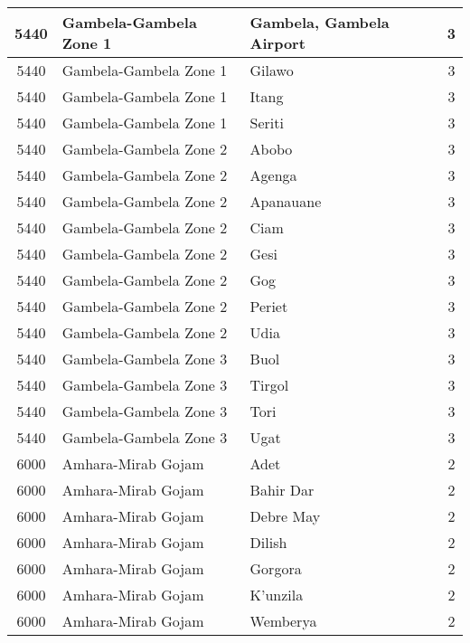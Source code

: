 \documentclass[12pt,a4paper]{report}
\begin{document}
\begin{tabular}{|c|l|l|c|}
\hline 
\rule[-1ex]{0pt}{2.5ex} 5440 & Gambela-Gambela Zone 1 & Gambela, Gambela Airport & 3 \\
\hline 
\rule[-1ex]{0pt}{2.5ex} 5440 & Gambela-Gambela Zone 1 & Gilawo & 3 \\
\hline 
\rule[-1ex]{0pt}{2.5ex} 5440 & Gambela-Gambela Zone 1 & Itang & 3 \\
\hline 
\rule[-1ex]{0pt}{2.5ex} 5440 & Gambela-Gambela Zone 1 & Seriti & 3 \\
\hline 
\rule[-1ex]{0pt}{2.5ex} 5440 & Gambela-Gambela Zone 2 & Abobo & 3 \\
\hline 
\rule[-1ex]{0pt}{2.5ex} 5440 & Gambela-Gambela Zone 2 & Agenga & 3 \\
\hline 
\rule[-1ex]{0pt}{2.5ex} 5440 & Gambela-Gambela Zone 2 & Apanauane & 3 \\
\hline 
\rule[-1ex]{0pt}{2.5ex} 5440 & Gambela-Gambela Zone 2 & Ciam & 3 \\
\hline 
\rule[-1ex]{0pt}{2.5ex} 5440 & Gambela-Gambela Zone 2 & Gesi & 3 \\
\hline 
\rule[-1ex]{0pt}{2.5ex} 5440 & Gambela-Gambela Zone 2 & Gog & 3 \\
\hline 
\rule[-1ex]{0pt}{2.5ex} 5440 & Gambela-Gambela Zone 2 & Periet & 3 \\
\hline 
\rule[-1ex]{0pt}{2.5ex} 5440 & Gambela-Gambela Zone 2 & Udia & 3 \\
\hline 
\rule[-1ex]{0pt}{2.5ex} 5440 & Gambela-Gambela Zone 3 & Buol & 3 \\
\hline 
\rule[-1ex]{0pt}{2.5ex} 5440 & Gambela-Gambela Zone 3 & Tirgol & 3 \\
\hline 
\rule[-1ex]{0pt}{2.5ex} 5440 & Gambela-Gambela Zone 3 & Tori & 3 \\
\hline 
\rule[-1ex]{0pt}{2.5ex} 5440 & Gambela-Gambela Zone 3 & Ugat & 3 \\
\hline 
\rule[-1ex]{0pt}{2.5ex} 6000 & Amhara-Mirab Gojam & Adet & 2 \\
\hline 
\rule[-1ex]{0pt}{2.5ex} 6000 & Amhara-Mirab Gojam & Bahir Dar & 2 \\
\hline 
\rule[-1ex]{0pt}{2.5ex} 6000 & Amhara-Mirab Gojam & Debre May & 2 \\
\hline 
\rule[-1ex]{0pt}{2.5ex} 6000 & Amhara-Mirab Gojam & Dilish & 2 \\
\hline 
\rule[-1ex]{0pt}{2.5ex} 6000 & Amhara-Mirab Gojam & Gorgora & 2 \\
\hline 
\rule[-1ex]{0pt}{2.5ex} 6000 & Amhara-Mirab Gojam & K'unzila & 2 \\
\hline 
\rule[-1ex]{0pt}{2.5ex} 6000 & Amhara-Mirab Gojam & Wemberya & 2 \\

\end{tabular}
\end{document}
